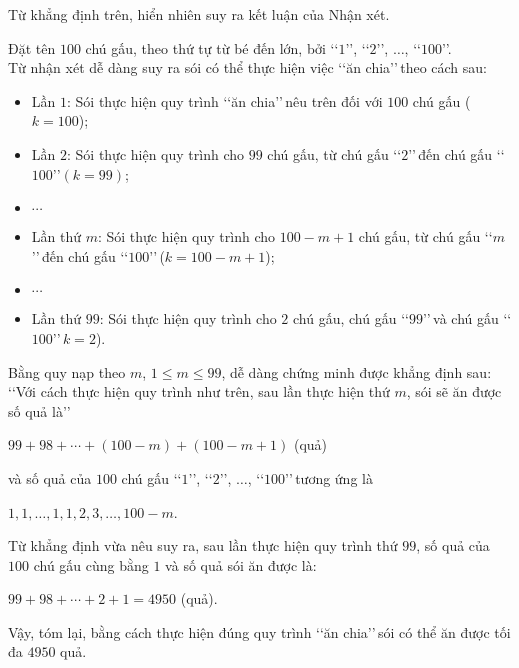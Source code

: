 \begin{bt}
{\begin{nx}
\begin{cm}
				Từ khẳng định trên, hiển nhiên suy ra kết luận của Nhận xét.
			\end{cm}
		\end{nx}
		Đặt tên $100$ chú gấu, theo thứ tự từ bé đến lớn, bởi  \lq\lq$1$\rq\rq, \lq\lq$2$\rq\rq, $\ldots$, \lq\lq$100$\rq\rq.\\
		Từ nhận xét dễ dàng suy ra sói có thể thực hiện việc \lq\lq ăn chia\rq\rq \,theo cách sau: 
		\begin{itemize}
			\item Lần $1$: Sói thực hiện quy trình \lq\lq ăn chia\rq\rq\,nêu trên đối với $100$ chú gấu ($k=100$);
			\item Lần $2$: Sói thực hiện quy trình cho $99$ chú gấu, từ chú gấu \lq\lq$2$\rq\rq \,đến chú gấu \lq\lq$100$\rq\rq $(k=99)$;
			\item $\cdots$
			\item Lần thứ $m$: Sói thực hiện quy trình cho $100-m+1$ chú gấu, từ chú gấu \lq\lq$m$\rq\rq\,đến chú gấu \lq\lq$100$\rq\rq \,($k=100-m+1$);
			\item $\cdots$
			\item Lần thứ $99$: Sói thực hiện quy trình cho $2$ chú gấu, chú gấu \lq\lq$99$\rq\rq\,và chú gấu \lq\lq$100$\rq\rq\,$k=2$).
		\end{itemize}
		Bằng quy nạp theo $m$, $1 \le m \le 99$, dễ dàng chứng minh được khẳng định sau:\\
		\lq\lq Với cách thực hiện quy trình như trên, sau lần thực hiện thứ $m$, sói sẽ ăn được số quả là\rq\rq
		\begin{center}
			$99+98+\cdots+(100-m)+(100-m+1)$ (quả)
		\end{center}
		và số quả của $100$ chú gấu \lq\lq$1$\rq\rq, \lq\lq$2$\rq\rq, $\ldots$, \lq\lq$100$\rq\rq \,tương ứng là
		\begin{center}
			$1,1,\ldots,1,1,2,3,\ldots,100-m$.
		\end{center}
		Từ khẳng định vừa nêu suy ra, sau lần thực hiện quy trình thứ $99$, số quả của $100$ chú gấu cùng bằng $1$ và số quả sói ăn được là:
		\begin{center}
			$99+98+\cdots+2+1=4950$ (quả).
		\end{center}
		Vậy, tóm lại, bằng cách thực hiện đúng quy trình \lq\lq ăn chia\rq\rq \,sói có thể ăn được tối đa $4950$ quả.
	}
	
\end{bt}
